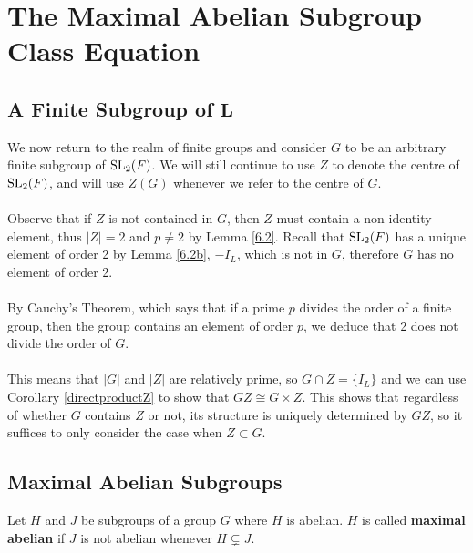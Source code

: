 \chapter[The Maximal Abelian Subgroup Class Equation]{The Maximal Abelian Subgroup Class Equation}\label{Ch6_MaximalAbelianSubgroupClassEquation}

\section[A finite subgroup of $\SL_2(F)$]{A Finite Subgroup of $\pmb{L}$}

We now return to the realm of finite groups and consider $G$ to be an arbitrary finite subgroup of $\SL_2(F)$. We will still continue to use $Z$ to denote the centre of $\SL_2(F)$, and will use $Z(G)$ whenever we refer to the centre of $G$. \\
\\
Observe that if $Z$ is not contained in $G$, then $Z$ must contain a non-identity element, thus $|Z| = 2$ and $p \neq 2$ by Lemma \ref{6.2}. Recall that $\SL_2(F)$ has a unique element of order 2 by Lemma \ref{6.2b}, $- I_L$, which is not in $G$, therefore $G$ has no element of order 2. \\
\\
By Cauchy's Theorem, which says that if a prime $p$ divides the order of a finite group, then the group contains an element of order $p$, we deduce that 2 does not divide the order of $G$. \\
\\
This means that $|G|$ and $|Z|$ are relatively prime, so $G \cap Z = \{ I_L \}$ and we can use Corollary \ref{directproductZ} to show that $GZ \cong G \times Z$. This shows that regardless of whether $G$ contains $Z$ or not, its structure is uniquely determined by $GZ$, so it suffices to only consider the case when $Z \subset G$. 

\section{Maximal Abelian Subgroups}

\begin{definition}
\label{IsMaximalAbelian}
\leanok
Let $H$ and $J$ be subgroups of a group $G$ where $H$ is abelian. $H$ is called \textbf{maximal abelian} if $J$ is not abelian whenever $H \subsetneq J$.
\end{definition}

